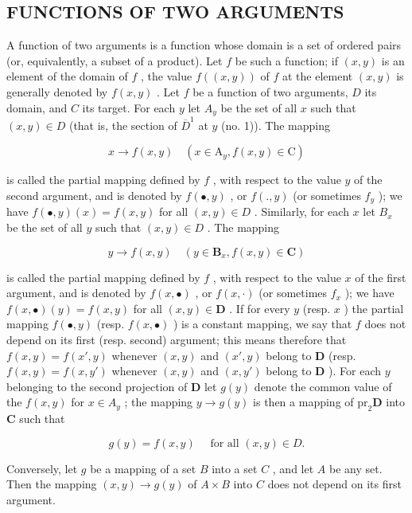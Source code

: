 \subsection{FUNCTIONS OF TWO ARGUMENTS}

A function of two arguments is a function whose domain is a set of ordered pairs (or, equivalently, a subset of a product). Let \(f\) be such a function; if \((x, y)\) is an element of the domain of \(f\) , the value \(f((x, y))\) of \(f\) at the element \((x, y)\) is generally denoted by \(f(x, y)\) . Let \(f\) be a function of two arguments, \(D\) its domain, and \(C\) its target. For each \(y\) let \(A_y\) be the set of all \(x\) such that \((x, y) \in D\) (that is, the section of \(\overline{D}^1\) at \(y\) (no. 1)). The mapping

\[
x \rightarrow f (x, y) \quad (x \in \mathrm{A} _ {y}, f (x, y) \in \mathrm{C})
\]

is called the partial mapping defined by \(f\) , with respect to the value \(y\) of the second argument, and is denoted by \(f(\bullet, y)\) , or \(f(., y)\) (or sometimes \(f_y\) ); we have \(f(\bullet, y)(x) = f(x, y)\) for all \((x, y) \in D\) . Similarly, for each \(x\) let \(B_x\) be the set of all \(y\) such that \((x, y) \in D\) . The mapping

\[
y \rightarrow f (x, y) \quad (y \in \mathbf {B} _ {x}, f (x, y) \in \mathbf {C})
\]

is called the partial mapping defined by \(f\) , with respect to the value \(x\) of the first argument, and is denoted by \(f(x, \bullet)\) , or \(f(x, \cdot)\) (or sometimes \(f_x\) ); we have \(f(x, \bullet)(y) = f(x, y)\) for all \((x, y) \in \mathbf{D}\) . If for every \(y\) (resp. \(x\) ) the partial mapping \(f(\bullet, y)\) (resp. \(f(x, \bullet)\) ) is a constant mapping, we say that \(f\) does not depend on its first (resp. second) argument; this means therefore that \(f(x, y) = f(x', y)\) whenever \((x, y)\) and \((x', y)\) belong to \(\mathbf{D}\) (resp. \(f(x, y) = f(x, y')\) whenever \((x, y)\) and \((x, y')\) belong to \(\mathbf{D}\) ). For each \(y\) belonging to the second projection of \(\mathbf{D}\) let \(g(y)\) denote the common value of the \(f(x, y)\) for \(x \in A_y\) ; the mapping \(y \to g(y)\) is then a mapping of \(\mathrm{pr}_2\mathbf{D}\) into \(\mathbf{C}\) such that

\[
g (y) = f (x, y) \quad \text {   for   all   } (x, y) \in D.
\]

Conversely, let \(g\) be a mapping of a set \(B\) into a set \(C\) , and let \(A\) be any set. Then the mapping \((x, y) \to g(y)\) of \(A \times B\) into \(C\) does not depend on its first argument.

